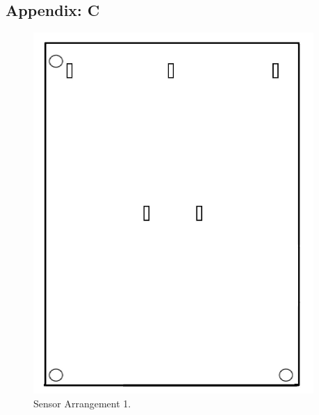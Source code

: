 \subsection*{Appendix: C}

\begin{figure}[H]
\centering
\includegraphics[width=0.95\textwidth]{figures/sarray1.jpg}
\caption{Sensor Arrangement 1.}
\end{figure}


